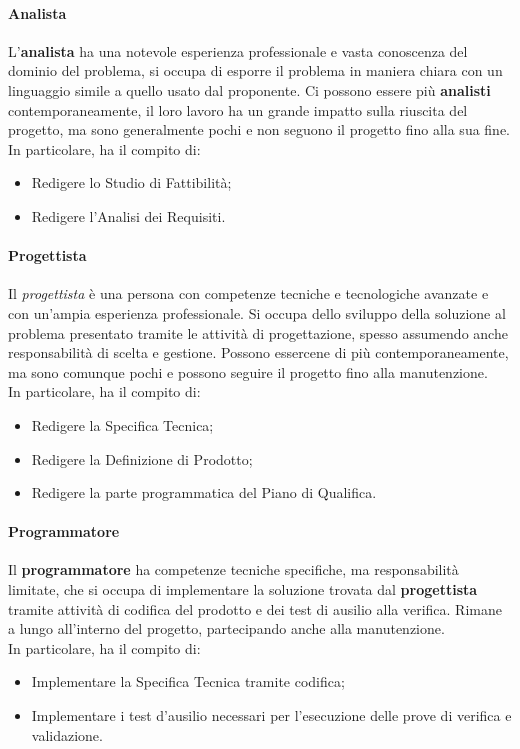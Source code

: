 \documentclass[../norme_di_progetto.tex]{subfiles}
\begin{document}
        \paragraph{Analista}
        L'\textbf{analista} ha una notevole esperienza professionale e vasta conoscenza del dominio del problema, si occupa di esporre il problema in maniera chiara con un linguaggio simile a quello usato dal proponente. Ci possono essere più \textbf{analisti} contemporaneamente, il loro lavoro ha un grande impatto sulla riuscita del progetto, ma sono generalmente pochi e non seguono il progetto fino alla sua fine.\\
        In particolare, ha il compito di:
        \begin{itemize} 
            \item Redigere lo Studio di Fattibilità;
            \item Redigere l'Analisi dei Requisiti.
        \end{itemize}

        \paragraph{Progettista}
        Il \emph{progettista} è una persona con competenze tecniche e tecnologiche avanzate e con un'ampia esperienza professionale. Si occupa dello sviluppo della soluzione al problema presentato tramite le attività di progettazione, spesso assumendo anche responsabilità di scelta e gestione. Possono essercene di più contemporaneamente, ma sono comunque pochi e possono seguire il progetto fino alla manutenzione.\\
        In particolare, ha il compito di:
        \begin{itemize}
            \item Redigere la Specifica Tecnica;
            \item Redigere la Definizione di Prodotto;
            \item Redigere la parte programmatica del Piano di Qualifica.
        \end{itemize}

        \paragraph{Programmatore}
        Il \textbf{programmatore} ha competenze tecniche specifiche, ma responsabilità limitate, che si occupa di implementare la soluzione trovata dal \textbf{progettista} tramite attività di codifica del prodotto e dei test di ausilio alla verifica. Rimane a lungo all'interno del progetto, partecipando anche alla manutenzione.\\
        In particolare, ha il compito di:
        \begin{itemize}
            \item Implementare la Specifica Tecnica tramite codifica;
            \item Implementare i test d'ausilio necessari per l'esecuzione delle prove di verifica e validazione.
        \end{itemize}
\end{document}
